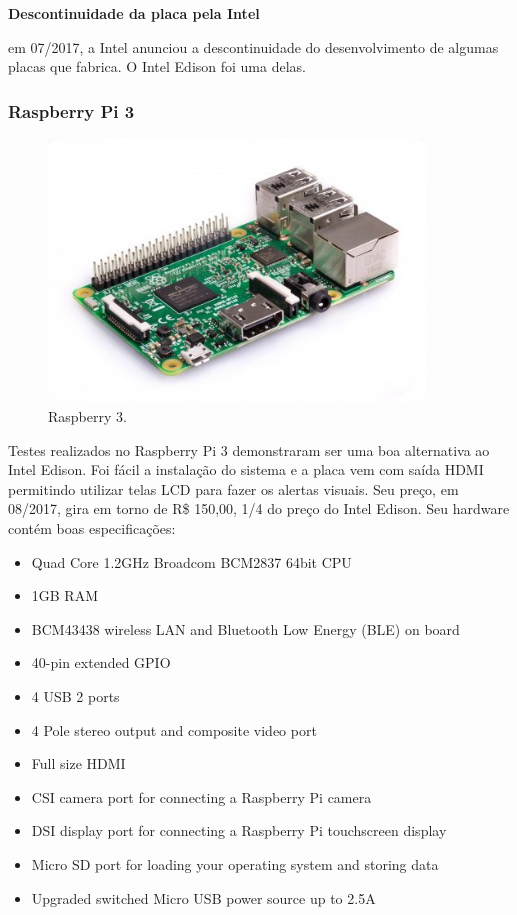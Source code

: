 \documentclass[
	12pt,				%
	oneside,			%
	a4paper,			%
	brazil				%
]{abntex2}
\begin{document}
\textbf{Descontinuidade da placa pela Intel}

em 07/2017, a Intel anunciou a descontinuidade do desenvolvimento de algumas placas que fabrica. O Intel Edison foi uma delas.

\subsubsection{Raspberry Pi 3}

\begin{figure}[!h]
\centering
\includegraphics[width=10cm, center]{images/raspberry-pi}
\caption{Raspberry 3.}
\label{Rotulo}
\end{figure}

Testes realizados no Raspberry Pi 3 demonstraram ser uma boa alternativa ao Intel Edison. Foi fácil a instalação do sistema e a placa vem com saída HDMI permitindo utilizar telas LCD para fazer os alertas visuais.
Seu preço, em 08/2017, gira em torno de R\$ 150,00, 1/4 do preço do Intel Edison. Seu hardware contém boas especificações:

\begin{itemize}
\item Quad Core 1.2GHz Broadcom BCM2837 64bit CPU
\item 1GB RAM
\item BCM43438 wireless LAN and Bluetooth Low Energy (BLE) on board
\item 40-pin extended GPIO
\item 4 USB 2 ports
\item 4 Pole stereo output and composite video port
\item Full size HDMI
\item CSI camera port for connecting a Raspberry Pi camera
\item DSI display port for connecting a Raspberry Pi touchscreen display
\item Micro SD port for loading your operating system and storing data
\item Upgraded switched Micro USB power source up to 2.5A
\end{itemize}
\end{document}
